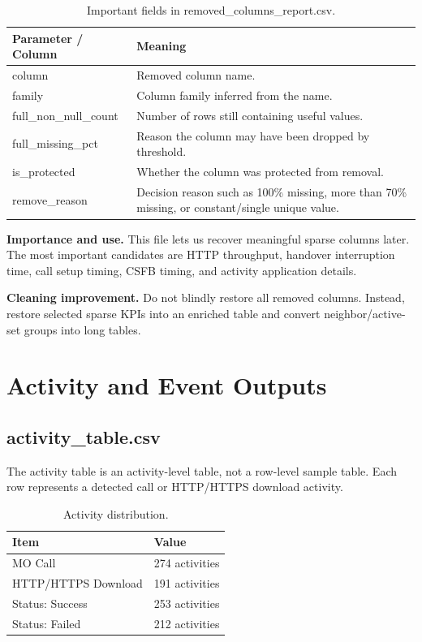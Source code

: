 \documentclass[12pt,a4paper]{article}
\begin{document}
\begin{table}[H]
\centering
\begin{tabularx}{\textwidth}{P{0.38\textwidth}Y}
\toprule
\textbf{Parameter / Column} & \textbf{Meaning} \\
\midrule
{\ttfamily column} & Removed column name. \\
{\ttfamily family} & Column family inferred from the name. \\
{\ttfamily full\_\allowbreak{}non\_\allowbreak{}null\_\allowbreak{}count} & Number of rows still containing useful values. \\
{\ttfamily full\_\allowbreak{}missing\_\allowbreak{}pct} & Reason the column may have been dropped by threshold. \\
{\ttfamily is\_\allowbreak{}protected} & Whether the column was protected from removal. \\
{\ttfamily remove\_\allowbreak{}reason} & Decision reason such as 100\% missing, more than 70\% missing, or constant/single unique value. \\
\bottomrule
\end{tabularx}
\caption{Important fields in removed\_columns\_report.csv.}
\end{table}


\textbf{Importance and use.} This file lets us recover meaningful sparse columns later. The most important candidates are HTTP throughput, handover interruption time, call setup timing, CSFB timing, and activity application details.

\textbf{Cleaning improvement.} Do not blindly restore all removed columns. Instead, restore selected sparse KPIs into an enriched table and convert neighbor/active-set groups into long tables.


\section{Activity and Event Outputs}

\subsection{activity\_table.csv}
The activity table is an activity-level table, not a row-level sample table. Each row represents a detected call or HTTP/HTTPS download activity.


\begin{table}[H]
\centering
\begin{tabularx}{0.94\textwidth}{P{5.2cm}Y}
\toprule
\textbf{Item} & \textbf{Value} \\
\midrule
MO Call & 274 activities \\
HTTP/HTTPS Download & 191 activities \\
Status: Success & 253 activities \\
Status: Failed & 212 activities \\
\bottomrule
\end{tabularx}
\caption{Activity distribution.}
\end{table}
\end{document}
